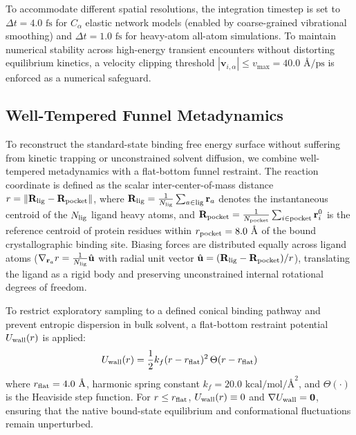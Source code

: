 \documentclass[journal=jpcbfk,manuscript=article]{achemso}
\begin{document}
To accommodate different spatial resolutions, the integration timestep is set to $\Delta t = 4.0\text{ fs}$ for $C_\alpha$ elastic network models (enabled by coarse-grained vibrational smoothing) and $\Delta t = 1.0\text{ fs}$ for heavy-atom all-atom simulations. To maintain numerical stability across high-energy transient encounters without distorting equilibrium kinetics, a velocity clipping threshold $|\mathbf{v}_{i,\alpha}| \le v_{\max} = 40.0\text{ \AA/ps}$ is enforced as a numerical safeguard.

\subsection{Well-Tempered Funnel Metadynamics}
To reconstruct the standard-state binding free energy surface without suffering from kinetic trapping or unconstrained solvent diffusion, we combine well-tempered metadynamics with a flat-bottom funnel restraint.\cite{barducci2008well,limongelli2013funnel} The reaction coordinate is defined as the scalar inter-center-of-mass distance $r = \|\mathbf{R}_{\rm lig} - \mathbf{R}_{\rm pocket}\|$, where $\mathbf{R}_{\rm lig} = \frac{1}{N_{\rm lig}} \sum_{a \in \text{lig}} \mathbf{r}_a$ denotes the instantaneous centroid of the $N_{\rm lig}$ ligand heavy atoms, and $\mathbf{R}_{\rm pocket} = \frac{1}{N_{\rm pocket}} \sum_{i \in \text{pocket}} \mathbf{r}_i^0$ is the reference centroid of protein residues within $r_{\rm pocket} = 8.0\text{ \AA}$ of the bound crystallographic binding site. Biasing forces are distributed equally across ligand atoms ($\nabla_{\mathbf{r}_a} r = \frac{1}{N_{\rm lig}} \hat{\mathbf{u}}$ with radial unit vector $\hat{\mathbf{u}} = (\mathbf{R}_{\rm lig} - \mathbf{R}_{\rm pocket})/r$), translating the ligand as a rigid body and preserving unconstrained internal rotational degrees of freedom.

To restrict exploratory sampling to a defined conical binding pathway and prevent entropic dispersion in bulk solvent, a flat-bottom restraint potential $U_{\rm wall}(r)$ is applied:
\begin{equation}
U_{\rm wall}(r) = \frac{1}{2} k_f (r - r_{\rm flat})^2 \, \Theta(r - r_{\rm flat})
\end{equation}
where $r_{\rm flat} = 4.0\text{ \AA}$, harmonic spring constant $k_f = 20.0\text{ kcal/mol/\AA}^2$, and $\Theta(\cdot)$ is the Heaviside step function. For $r \le r_{\rm flat}$, $U_{\rm wall}(r) \equiv 0$ and $\nabla U_{\rm wall} = \mathbf{0}$, ensuring that the native bound-state equilibrium and conformational fluctuations remain unperturbed.
\end{document}

